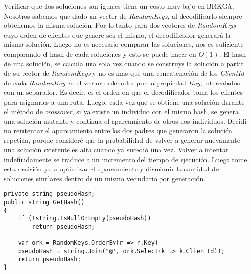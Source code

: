 \bigskip

Verificar que dos soluciones son iguales tiene un costo muy bajo en BRKGA. Nosotros sabemos que dado un vector de \textit{RandomKeys}, al decodificarlo siempre obtenemos la misma solución. Por lo tanto para dos vectores de \textit{RandomKeys} cuyo orden de clientes que genere sea el mismo, el decodificador generará la misma solución. Luego no es necesario comparar las soluciones, nos es suficiente comparando el hash de cada soluciones y esto se puede hacer en $O(1)$. El hash de una solución, se calcula una sola vez cuando se construye la solución a partir de su vector de \textit{RandomKeys} y no es mas que una concatenación de los \textit{ClientId} de cada \textit{RandomKey} en el vector ordenados por la propiedad \textit{Key}, intercalados con un separador. Es decir, es el orden en que el decodificador toma los clientes para asignarlos a una ruta. Luego, cada vez que se obtiene una solución durante el método de \textit{crossover}, si ya existe un individuo con el mismo hash, se genera una solución mutante y continua el apareamiento de otros dos individuos. Decidí no reintentar el apareamiento entre los dos padres que generaron la solución repetida, porque consideré que la probabilidad de volver a generar nuevamente una solución existente es alta cuando ya sucedió una vez. Volver a intentar indefinidamente se traduce a un incremento del tiempo de ejecución. Luego tome esta decisión para optimizar el apareamiento y disminuir la cantidad de soluciones similares dentro de un mismo vecindario por generación.

\bigskip

\begin{minipage}{\textwidth}
\begin{lstlisting}
private string pseudoHash;
public string GetHash()
{
	if (!string.IsNullOrEmpty(pseudoHash))
		return pseudoHash;
		
	var ork = RandomKeys.OrderBy(r => r.Key)
	pseudoHash = string.Join("@", ork.Select(k => k.ClientId));
	return pseudoHash;
}
\end{lstlisting}
\end{minipage}

\bigskip

